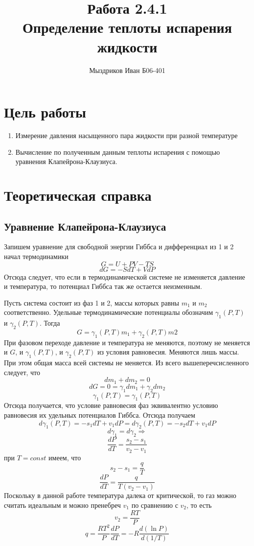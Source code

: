 \documentclass[a4paper, 12pt]{article}%
\author{Мыздриков Иван Б06-401}
\title{\textbf{Работа 2.4.1 \\ 
Определение теплоты испарения жидкости}}
\begin{document}
\maketitle
\section*{Цель работы}
\begin{enumerate}
\item Измерение давления насыщенного пара жидкости при разной температуре
\item Вычисление по полученным данным теплоты испарения с помощью уравнения Клапейрона-Клаузиуса.
\end{enumerate}
\section*{Теоретическая справка}
\subsection*{Уравнение Клапейрона-Клаузиуса}
Запишем уравнение для свободной энергии Гиббса и дифференциал из 1 и 2 начал термодинамики
\[G = U + PV - TS\]
\[dG = -SdT + VdP\]
Отсюда следует, что если в термодинамической системе не изменяется давление и температура, то потенциал Гиббса так же остается неизменным.

Пусть система состоит из фаз 1 и 2, массы которых равны $m_1$ и $m_2$ соответственно. Удельные термодинамические потенциалы обозначим $\gamma_1 (P, T)$ и $\gamma_2 (P, T)$. Тогда 
\[G = \gamma_1 (P, T) m_1 + \gamma_2 (P, T) m2\]
При фазовом переходе давление и температура не меняются, поэтому не меняется и $G$, и $\gamma_1 (P, T)$, и $\gamma_2 (P, T)$ из условия равновесия. Меняются лишь массы. При этом общая масса всей системы не меняется. Из всего вышеперечсисленного следует, что
\[dm_1 + dm_2 = 0\]
\[dG = 0 = \gamma_1 dm_1 + \gamma_2 dm_2\]
\[\gamma_1 (P, T) = \gamma_1 (P, T)\]
Отсюда получается, что условие равновесия фаз эквивалентно условию равновесия их удельных потенциалов Гиббса. Отсюда получаем
\[d \gamma_1 (P, T) =  -s_1 dT + v_1 dP = d \gamma_2 (P, T) = -s_2 dT + v_1 dP\]
\[d \gamma_1 = d \gamma_2 \Rightarrow\]
\[\dfrac{dP}{dT} = \dfrac{s_2 - s_1}{v_2 - v_1}\]
при $T = const$ имеем, что
\[s_2 - s_1 = \dfrac{q}{T}\]
\[\dfrac{dP}{dT} = \dfrac{q}{T(v_2 - v_1)}\]
Поскольку в данной работе температура далека от критической, то газ можно считать идеальным и можно пренебреч $v_1$ по сравнению с $v_2$, то есть 
\[v_2 = \dfrac{RT}{P}\]
\[q = \dfrac{RT^2}{ P} \dfrac{dP}{dT} = -R \dfrac{d(\ln P)}{d(1/T)}\]
\end{document}
